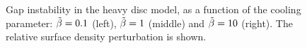 \begin{figure}
  \caption{Gap instability in the heavy disc model, as a function of
    the cooling parameter: $\tilde{\beta}=0.1$ (left), $\tilde{\beta}=1$ (middle)
    and $\tilde{\beta}=10$ (right). The relative surface density
    perturbation is shown. \label{polarxy_q1d5}} 
\end{figure}
